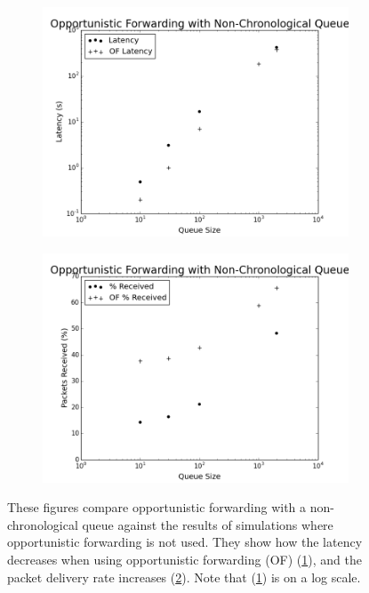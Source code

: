         \begin{figure}
            \centering
            \begin{subfigure}{0.5\textwidth}
                \centering
                \includegraphics[width=\linewidth]{./images/OF_Complete_Latency.png}
                \caption{}
                \label{fig:of_complete_latency}
            \end{subfigure}%
            \begin{subfigure}{0.5\textwidth}
                \includegraphics[width=\linewidth]{./images/OF_Complete_Received.png}
                \caption{}
                \label{fig:of_complete_received}
            \end{subfigure}
            \caption{These figures compare opportunistic forwarding with a non-chronological queue against the results of simulations where opportunistic forwarding is not used. They show how the latency decreases when using opportunistic forwarding (OF) (\ref{fig:of_complete_latency}), and the packet delivery rate increases (\ref{fig:of_complete_received}). Note that (\ref{fig:of_complete_latency}) is on a log scale.}
            \label{fig:opportunistic_queue_good}
        \end{figure}

